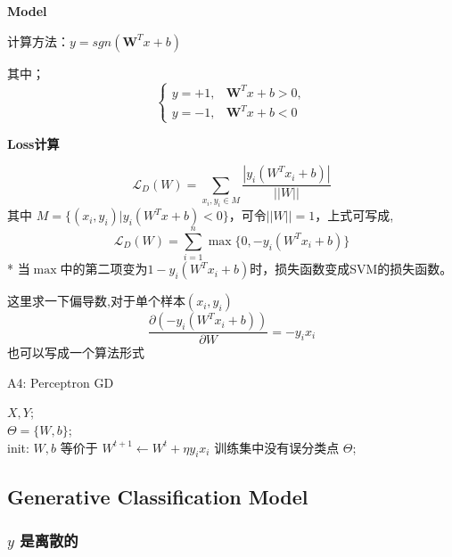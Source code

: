 \documentclass[UTF8]{ctexart}
\begin{document}
\textbf{Model}

计算方法：$y=sgn(\mathbf{W}^Tx+b)$

其中；
\begin{equation*}
    \left\{ \begin{aligned}
        y=+1, &\mathbf{W}^Tx+b > 0 , \\ 
        y=-1, &\mathbf{W}^Tx+b<0 
    \end{aligned}
    \right.
\end{equation*}

\textbf{Loss计算}

\begin{equation*}
    \mathcal{L}_D(W) = \sum_{x_i, y_i \in M} \frac{|y_i (W^Tx_i+b)|}{||W||}
\end{equation*}
其中 $M = \{(x_i, y_i) | y_i(W^Tx+b)<0\}$，可令$||W||=1$，上式可写成,
\begin{equation*}
    \mathcal{L}_D(W) = \sum_{i=1}^n\max\{0, -y_i(W^Tx_i+b)\} 
\end{equation*}
* 当$\max$中的第二项变为$1-y_i(W^Tx_i+b)$时，损失函数变成SVM的损失函数。

这里求一下偏导数,对于单个样本$(x_i, y_i)$
\begin{equation*}
    \frac{\partial (-y_i(W^Tx_i + b))}{\partial W} = -y_i x_i
\end{equation*}
也可以写成一个算法形式

\begin{algorithm}[htb]
    \caption{A4: Perceptron GD}
    \label{alg:A4}
    \begin{algorithmic}[1]
    \REQUIRE
    $X, Y$; \\
    \ENSURE 
    $\Theta=\{W, b\}$; \\
    \STATE init: $W, b$
    \REPEAT 
        \STATE 等价于 $W^{t+1} \leftarrow W^t + \eta y_i x_i$
    \ENDIF
    \UNTIL 训练集中没有误分类点
    \RETURN $\Theta$;
    \end{algorithmic}
\end{algorithm}


\subsection{Generative Classification Model}
\subsubsection*{$y$ 是离散的}
\end{document}
